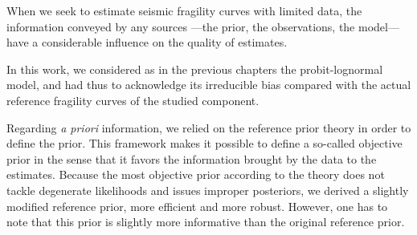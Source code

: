 






When we seek to estimate seismic fragility curves with limited data, 
the information conveyed by any sources ---the prior, the observations, the model--- have a considerable influence on the quality of estimates.




In this work, we considered as in the previous chapters the probit-lognormal model, and had thus to acknowledge its irreducible bias compared with the actual reference fragility curves of the studied component.

Regarding \emph{a priori} information, we 
relied on the reference prior theory in order to define the prior. This framework makes it possible to define a so-called objective prior in the sense that it favors the information brought by the data to the estimates. Because the
most objective prior according to the theory does not
tackle degenerate likelihoods and issues improper posteriors, we derived a slightly modified reference prior, more efficient and more robust.
However, one has to note that this prior is slightly more informative than the original reference prior.

